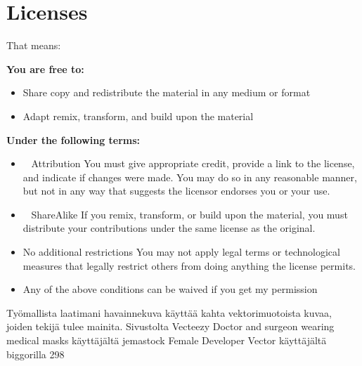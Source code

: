 
\pagestyle{empty}
\chapter*{Licenses}

That means:

\textbf{You are free to:}
\begin{itemize}
\item Share \textemdash copy and redistribute the material in any medium or format
\item Adapt \textemdash remix, transform, and build upon the material
\end{itemize}

\textbf{Under the following terms:}
\begin{itemize}
\item \ccAttribution~ Attribution \textemdash You must give appropriate credit, provide a link to the license, and indicate if changes were made. You may do so in any reasonable manner, but not in any way that suggests the licensor endorses you or your use.
\item \ccShareAlike~ ShareAlike \textemdash If you remix, transform, or build upon the material, you must distribute your contributions under the same license as the original.
\item No additional restrictions \textemdash You may not apply legal terms or technological measures that legally restrict others from doing anything the license permits.
\item Any of the above conditions can be waived if you get my permission
\end{itemize}


Työmallista laatimani havainnekuva käyttää kahta vektorimuotoista kuvaa, joiden
tekijä tulee mainita.
Sivustolta Vecteezy
Doctor and surgeon wearing medical masks käyttäjältä jemastock
Female Developer Vector käyttäjältä biggorilla 298

\clearpage
